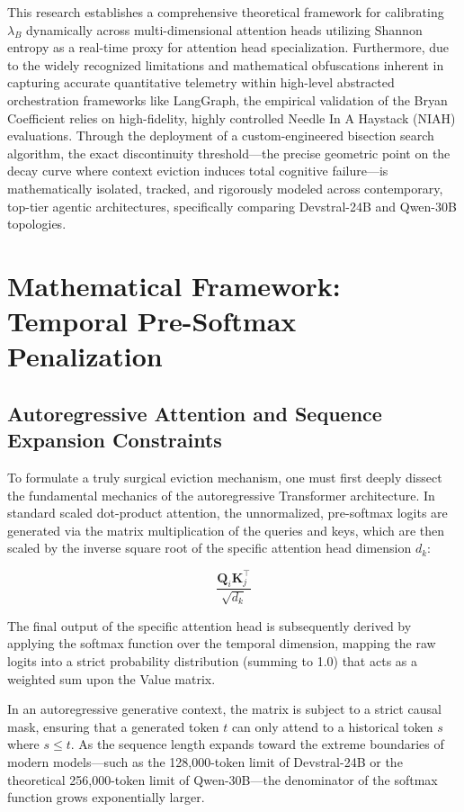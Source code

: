 \documentclass[11pt,a4paper]{article}
\newcommand{\bryanCoeff}{\lambda_B}
\begin{document}
This research establishes a comprehensive theoretical framework for calibrating \(\bryanCoeff\) dynamically across multi-dimensional attention heads utilizing Shannon entropy as a real-time proxy for attention head specialization. Furthermore, due to the widely recognized limitations and mathematical obfuscations inherent in capturing accurate quantitative telemetry within high-level abstracted orchestration frameworks like LangGraph, the empirical validation of the Bryan Coefficient relies on high-fidelity, highly controlled Needle In A Haystack (NIAH) evaluations. Through the deployment of a custom-engineered bisection search algorithm, the exact discontinuity threshold---the precise geometric point on the decay curve where context eviction induces total cognitive failure---is mathematically isolated, tracked, and rigorously modeled across contemporary, top-tier agentic architectures, specifically comparing Devstral-24B and Qwen-30B topologies.

\section{Mathematical Framework: Temporal Pre-Softmax Penalization}

\subsection{Autoregressive Attention and Sequence Expansion Constraints}
To formulate a truly surgical eviction mechanism, one must first deeply dissect the fundamental mechanics of the autoregressive Transformer architecture. In standard scaled dot-product attention, the unnormalized, pre-softmax logits are generated via the matrix multiplication of the queries and keys, which are then scaled by the inverse square root of the specific attention head dimension \(d_k\):

\[
\frac{\mathbf{Q}_i \mathbf{K}_j^\top}{\sqrt{d_k}}
\]

The final output of the specific attention head is subsequently derived by applying the softmax function over the temporal dimension, mapping the raw logits into a strict probability distribution (summing to 1.0) that acts as a weighted sum upon the Value matrix.

In an autoregressive generative context, the matrix is subject to a strict causal mask, ensuring that a generated token \(t\) can only attend to a historical token \(s\) where \(s \leq t\). As the sequence length expands toward the extreme boundaries of modern models---such as the 128,000-token limit of Devstral-24B\cite{2} or the theoretical 256,000-token limit of Qwen-30B\cite{3}---the denominator of the softmax function grows exponentially larger.
\end{document}
